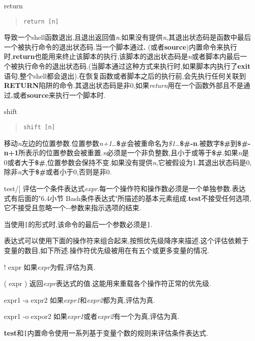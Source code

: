 \documentclass[draft,openany]{book}
\begin{document}
\begin{CJK}{UTF8}{gbsn}
\begin{basedescript}{\desclabelstyle{\nextlinelabel}\desclabelwidth{2.5em}}
    \item[return]
        \begin{quote}
            \verb+return [n]+
        \end{quote}
        导致一个shell函数退出,且退出返回值\emph{n}.如果没有提供\emph{n},其退出状态码是函数中最后一个被执行命令的退出状态码.当一个脚本通过\textbf{.} (或者\textbf{source})内置命令来执行时,\textbf{return}也能用来终止该脚本的执行,该脚本的退出状态码是\emph{n}或者脚本内最后一个被执行命令的退出状态码.(当脚本通过这种方式来执行时,如果脚本内执行了\textbf{exit}语句,整个shell都会退出).在恢复函数或者脚本之后的执行前,会先执行任何关联到\textbf{RETURN}陷阱的命令.其退出状态码是非0,如果\emph{return}用在一个函数外部且不是通过\textbf{.}或者\textbf{source}来执行一个脚本时.
    \item[shift]
        \begin{quote}
            \verb+shift [n]+
        \end{quote}
        移动\emph{n}左边的位置参数.位置参数\emph{n+1}{}\ldots{}\textbf{\$\#}会被重命名为\emph{\$1}{}\ldots{}\textbf{\$\#-n}.被数字\textbf{\$\#}到\textbf{\$\#-n+1}所表示的位置参数会被重置.\emph{n}必须是一个非负整数,且小于或等于\textbf{\$\#}.如果\emph{n}是0或者大于\textbf{\$\#},位置参数会保持不变.如果没有提供\emph{n},它被假设为1.其退出状态码是0,除非\emph{n}大于\textbf{\$\#}或者小于0,否则是非0.
    \item[test/[]
        评估一个条件表达式\emph{expr}.每一个操作符和操作数必须是一个单独参数.表达式有后面的"6.4小节 Bash条件表达式"所描述的基本元素组成.\textbf{test}不接受任何选项,它不接受且忽略一个-{}-参数来指示选项的结束.\par
        当使用\verb+[+的形式时,该命令的最后一个参数必须是\verb+]+.\par
        表达式可以使用下面的操作符来组合起来,按照优先级降序来描述.这个评估依赖于变量的数目,如下所述.操作符优先级被用在有五个或更多变量的情况.
        \begin{basedescript}{\desclabelstyle{\nextlinelabel}\desclabelwidth{2.5em}}
        \item[! expr] 如果\emph{expr}为假,评估为真.
        \item[( expr )] 返回\emph{expr}表达式的值.这能用来重载各个操作符正常的优先级.
        \item[expr1 -a expr2] 如果\emph{expr1}和\emph{expr2}都为真,评估为真.
        \item[expr1 -o expor2] 如果\emph{expr1}或者\emph{expr2}有一个为真,评估为真.
        \end{basedescript}
        \textbf{test}和\verb+[+内置命令使用一系列基于变量个数的规则来评估条件表达式.

\end{basedescript}
\end{CJK}
\end{document}
